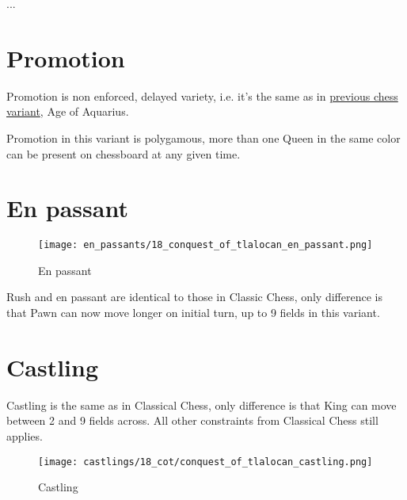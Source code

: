 ...




\clearpage %

\section*{Promotion}

Promotion is non enforced, delayed variety, i.e. it's the same as in
\hyperref[sec:Age of Aquarius/Promotion]{previous chess variant}, Age of Aquarius.

Promotion in this variant is polygamous, more than one Queen in the same color
can be present on chessboard at any given time.

\clearpage %

\section*{En passant}

\noindent
\begin{wrapfigure}{l}{0.4\textwidth}
\centering
\texttt{[image: en\_passants/18\_conquest\_of\_tlalocan\_en\_passant.png]}
\caption{En passant}
\label{fig:18_conquest_of_tlalocan_en_passant}
\end{wrapfigure}
Rush and en passant are identical to those in Classic Chess, only difference
is that Pawn can now move longer on initial turn, up to 9 fields in this
variant.

\clearpage %

\section*{Castling}

Castling is the same as in Classical Chess, only difference is that King can move between 2 and 9 fields across.
All other constraints from Classical Chess still applies.

\noindent
\begin{figure}[!h]
\texttt{[image: castlings/18\_cot/conquest\_of\_tlalocan\_castling.png]}
\caption{Castling}
\label{fig:conquest_of_tlalocan_castling}
\end{figure}

